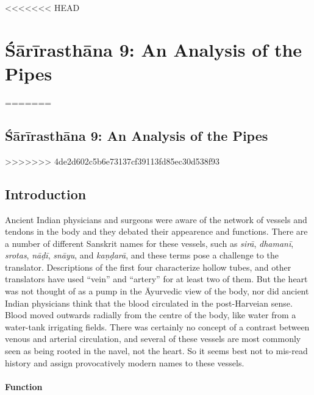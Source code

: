 <<<<<<< HEAD

\chapter{Śārīrasthāna 9:  An Analysis of the Pipes}

=======
\begin{refsection} 
\chapter{Śārīrasthāna 9:  An Analysis of the Pipes}

\setcounter{footnote}{0}

>>>>>>> 4de2d602c5b6e73137cf39113fd85ec30d538f93
\section{Introduction}

%
%
%
%
%
%

Ancient Indian physicians and surgeons were aware of the network of
vessels and tendons in the body and they debated their appearence and
functions. There are a number of different Sanskrit names for these
vessels, such as \emph{sirā}, \emph{dhamanī}, \emph{srotas},
\emph{nāḍī}, \emph{snāyu}, and \emph{kaṇḍarā}, and these terms pose a
challenge to the translator.  Descriptions of the first four
characterize hollow tubes, and other translators have used “vein” and
“artery” for at least two of them.  But the heart was not thought of
as a pump in the Āyurvedic view of the body, nor did ancient Indian
physicians think that the blood circulated in the post-Harveian sense.
Blood moved outwards radially from the centre of the body, like water
from a water-tank irrigating fields.  There was certainly no concept
of a contrast between venous and arterial circulation, and several of
these vessels are most commonly seen as being rooted in the navel, not
the heart.  So it seems best not to mis-read history and assign provocatively
modern names to these vessels.

\subsubsection{Function}


\end{refsection}
